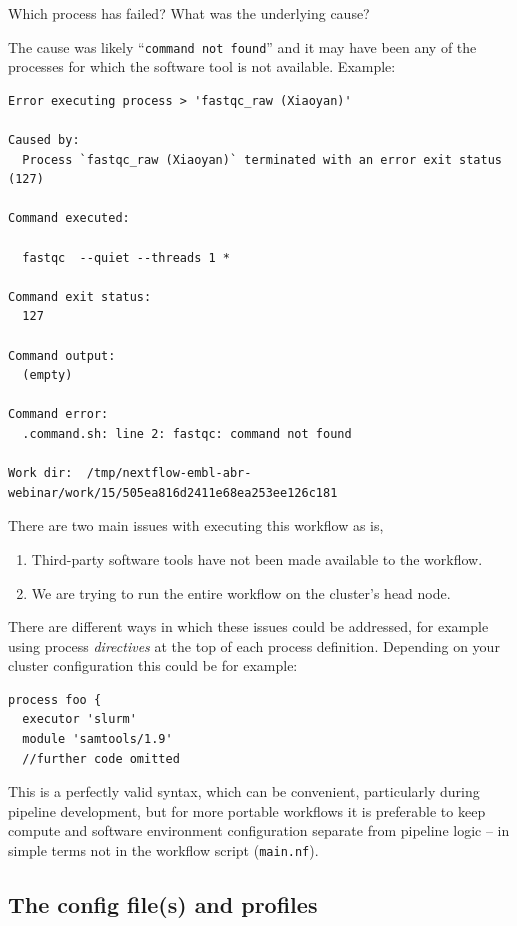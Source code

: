 \begin{questions}
Which process has failed?
What was the underlying cause?
\begin{answer}
The cause was likely ``\texttt{command not found}'' and it may have been any of the processes for which the software tool is not available.
Example:
\begin{lstlisting}
Error executing process > 'fastqc_raw (Xiaoyan)'

Caused by:
  Process `fastqc_raw (Xiaoyan)` terminated with an error exit status (127)

Command executed:

  fastqc  --quiet --threads 1 *

Command exit status:
  127

Command output:
  (empty)

Command error:
  .command.sh: line 2: fastqc: command not found

Work dir:  /tmp/nextflow-embl-abr-webinar/work/15/505ea816d2411e68ea253ee126c181
\end{lstlisting}
\end{answer}
\end{questions}


There are two main issues with executing this workflow as is, 
\begin{enumerate}
 \item Third-party software tools have not been made available to the workflow.
 \item We are trying to run the entire workflow on the cluster's head node.
\end{enumerate}

There are different ways in which these issues could be addressed, for example using process 
\emph{directives} at the top of each process definition. 
Depending on your cluster configuration this could be for example:
\begin{lstlisting}
process foo {
  executor 'slurm' 
  module 'samtools/1.9' 
  //further code omitted 
\end{lstlisting}

This is a perfectly valid syntax, which can be convenient, particularly during pipeline development, 
but for more portable workflows it is preferable to keep compute and software environment configuration 
separate from pipeline logic -- in simple terms not in the workflow script (\texttt{main.nf}).

\subsection{The config file(s) and profiles}

